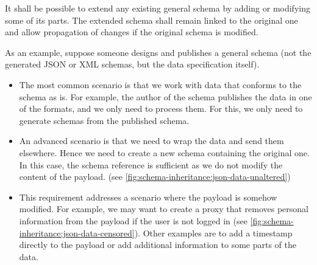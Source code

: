 \begin{requirement}
    It shall be possible to extend any existing general schema by adding or modifying some of its parts. The extended schema shall remain linked to the original one and allow propagation of changes if the original schema is modified.
    \label{requirement:schema-inheritance}
\end{requirement}

As an example, suppose someone designs and publishes a general schema (not the generated JSON or XML schemas, but the data specification itself).

\begin{itemize}
    \item The most common scenario is that we work with data that conforms to the schema as is. For example, the author of the schema publishes the data in one of the formats, and we only need to process them. For this, we only need to generate schemas from the published schema.
    \item An advanced scenario is that we need to wrap the data and send them elsewhere. Hence we need to create a new schema containing the original one. In this case, the schema reference is sufficient as we do not modify the content of the payload. (see \autoref{fig:schema-inheritance:json-data-unaltered})
    \item This requirement addresses a scenario where the payload is somehow modified. For example, we may want to create a proxy that removes personal information from the payload if the user is not logged in (see \autoref{fig:schema-inheritance:json-data-censored}). Other examples are to add a timestamp directly to the payload or add additional information to some parts of the data.
\end{itemize}

